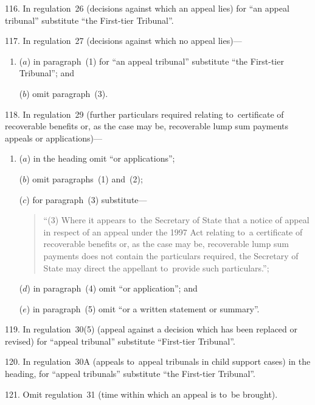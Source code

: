 \documentclass[12pt,a4paper]{article}
\begin{document}
\medskip

116.  In regulation~26 (decisions against which an appeal lies) for “an appeal tribunal” substitute “the First-tier Tribunal”.

\medskip

117.  In regulation~27 (decisions against which no appeal lies)—
\begin{enumerate}\item[]
($a$) in paragraph~(1) for “an appeal tribunal” substitute “the First-tier Tribunal”; and

($b$) omit paragraph~(3).
\end{enumerate}

\medskip

118.  In regulation~29 (further particulars required relating to~certificate of recoverable benefits or, as the case may be, recoverable lump sum payments appeals or applications)—
\begin{enumerate}\item[]
($a$) in the heading omit “or applications”;

($b$) omit paragraphs~(1) and~(2);

($c$) for paragraph~(3) substitute—
\begin{quotation}
“(3) Where it appears to~the Secretary of State that a notice of appeal in respect of an appeal under the 1997 Act relating to~a certificate of recoverable benefits or, as the case may be, recoverable lump sum payments does not contain the particulars required, the Secretary of State may direct the appellant to~provide such particulars.”;
\end{quotation}

($d$) in paragraph~(4) omit “or application”; and

($e$) in paragraph~(5) omit “or a written statement or summary”.
\end{enumerate}

\medskip

119.  In regulation~30(5) (appeal against a decision which has been replaced or revised) for “appeal tribunal” substitute “First-tier Tribunal”.

\medskip

120.  In regulation~30A (appeals to~appeal tribunals in child support cases) in the heading, for “appeal tribunals” substitute “the First-tier Tribunal”.

\medskip

121.  Omit regulation~31 (time within which an appeal is to~be brought).
\end{document}
